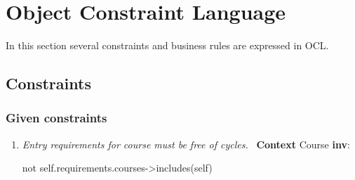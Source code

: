 \chapter{Object Constraint Language}

\npar In this section several constraints and business rules are expressed in
OCL. 

\section{Constraints}

\subsection{Given constraints}

\begin{enumerate}
  \item \emph{Entry requirements for course must be free of cycles.} \ 
	\npar \textbf{Context} Course \textbf{inv}:
	\par \hspace*{5 mm} not self.requirements.courses->includes(self)
	

\end{enumerate}

